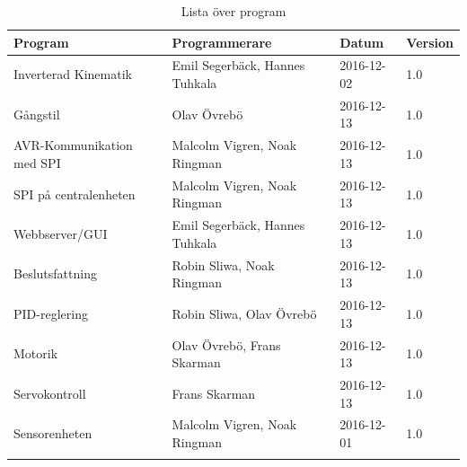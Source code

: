 \documentclass[a4paper,titlepage,12pt]{article}
\begin{document}
	\begin{longtable}[c]{l l l l}
		\textbf{Program} & \textbf{Programmerare} & \textbf{Datum}& \textbf{Version} \\ \midrule
		Inverterad Kinematik & Emil Segerbäck, Hannes Tuhkala & 2016-12-02 & 1.0 \\
		Gångstil & Olav Övrebö & 2016-12-13 & 1.0 \\ 
		AVR-Kommunikation med SPI & Malcolm Vigren, Noak Ringman & 2016-12-13 & 1.0 \\ 
		SPI på centralenheten & Malcolm Vigren, Noak Ringman & 2016-12-13 & 1.0 \\ 
		Webbserver/GUI & Emil Segerbäck, Hannes Tuhkala & 2016-12-13 & 1.0 \\ 
		Beslutsfattning & Robin Sliwa, Noak Ringman & 2016-12-13 & 1.0 \\ 
		PID-reglering & Robin Sliwa, Olav Övrebö & 2016-12-13 & 1.0 \\ 
		Motorik & Olav Övrebö, Frans Skarman & 2016-12-13 & 1.0 \\ 
		Servokontroll & Frans Skarman & 2016-12-13 & 1.0 \\ 
		Sensorenheten & Malcolm Vigren, Noak Ringman & 2016-12-01 & 1.0 \\
		
		\caption{Lista över program \label{table:programlisting}}
	\end{longtable}
	
\end{document}
